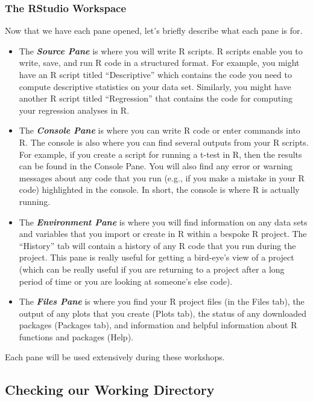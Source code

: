 \documentclass[
]{book}
\begin{document}
\hypertarget{the-rstudio-workspace}{%
\subsubsection{The RStudio Workspace}\label{the-rstudio-workspace}}

Now that we have each pane opened, let's briefly describe what each pane is for.

\begin{itemize}
\item
  The \textbf{\emph{Source Pane}} is where you will write R scripts. R scripts enable you to write, save, and run R code in a structured format. For example, you might have an R script titled ``Descriptive'' which contains the code you need to compute descriptive statistics on your data set. Similarly, you might have another R script titled ``Regression'' that contains the code for computing your regression analyses in R.
\item
  The \textbf{\emph{Console Pane}} is where you can write R code or enter commands into R. The console is also where you can find several outputs from your R scripts. For example, if you create a script for running a t-test in R, then the results can be found in the Console Pane. You will also find any error or warning messages about any code that you run (e.g., if you make a mistake in your R code) highlighted in the console. In short, the console is where R is actually running.
\item
  The \textbf{\emph{Environment Pane}} is where you will find information on any data sets and variables that you import or create in R within a bespoke R project. The ``History'' tab will contain a history of any R code that you run during the project. This pane is really useful for getting a bird-eye's view of a project (which can be really useful if you are returning to a project after a long period of time or you are looking at someone's else code).
\item
  The \textbf{\emph{Files Pane}} is where you find your R project files (in the Files tab), the output of any plots that you create (Plots tab), the status of any downloaded packages (Packages tab), and information and helpful information about R functions and packages (Help).
\end{itemize}

Each pane will be used extensively during these workshops.

\hypertarget{checking-our-working-directory}{%
\subsection{Checking our Working Directory}\label{checking-our-working-directory}}
\end{document}
